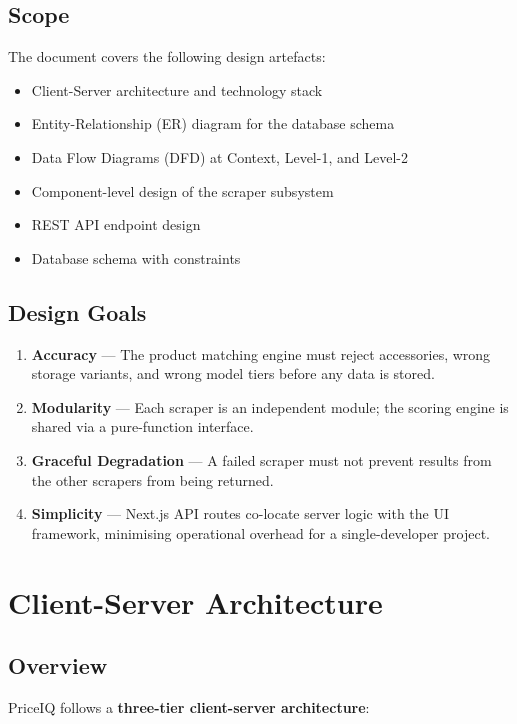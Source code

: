 \documentclass[12pt,a4paper]{report}
\begin{document}
\section{Scope}
The document covers the following design artefacts:
\begin{itemize}[noitemsep]
  \item Client-Server architecture and technology stack
  \item Entity-Relationship (ER) diagram for the database schema
  \item Data Flow Diagrams (DFD) at Context, Level-1, and Level-2
  \item Component-level design of the scraper subsystem
  \item REST API endpoint design
  \item Database schema with constraints
\end{itemize}

\section{Design Goals}
\begin{enumerate}[noitemsep]
  \item \textbf{Accuracy} --- The product matching engine must reject
        accessories, wrong storage variants, and wrong model tiers before
        any data is stored.
  \item \textbf{Modularity} --- Each scraper is an independent module; the
        scoring engine is shared via a pure-function interface.
  \item \textbf{Graceful Degradation} --- A failed scraper must not prevent
        results from the other scrapers from being returned.
  \item \textbf{Simplicity} --- Next.js API routes co-locate server logic with
        the UI framework, minimising operational overhead for a single-developer
        project.
\end{enumerate}

\chapter{Client-Server Architecture}

\section{Overview}
PriceIQ follows a \textbf{three-tier client-server architecture}:
\end{document}
